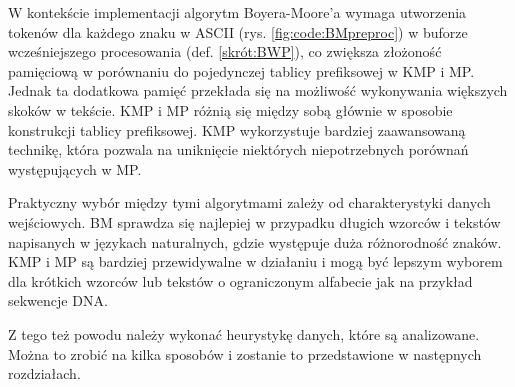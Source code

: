 W kontekście implementacji algorytm Boyera-Moore'a wymaga utworzenia tokenów dla
każdego znaku w ASCII (rys. \ref{fig:code:BMpreproc}) w buforze wcześniejszego 
procesowania (def. \ref{skrót:BWP}), co zwiększa złożoność pamięciową w porównaniu do pojedynczej 
tablicy prefiksowej w KMP i MP. Jednak ta dodatkowa pamięć przekłada się na 
możliwość wykonywania większych skoków w tekście. KMP i MP różnią się między 
sobą głównie w sposobie konstrukcji tablicy prefiksowej. KMP wykorzystuje 
bardziej zaawansowaną technikę, która pozwala na uniknięcie niektórych 
niepotrzebnych porównań występujących w MP.

Praktyczny wybór między tymi algorytmami zależy od charakterystyki danych
wejściowych. BM sprawdza się najlepiej w przypadku długich wzorców i tekstów
napisanych w językach naturalnych, gdzie występuje duża różnorodność znaków.
KMP i MP są bardziej przewidywalne w działaniu i mogą być lepszym wyborem dla 
krótkich wzorców lub tekstów o ograniczonym alfabecie jak na przykład sekwencje
DNA.

Z tego też powodu należy wykonać heurystykę danych, które są analizowane.
Można to zrobić na kilka sposobów i zostanie to przedstawione w następnych rozdziałach.
